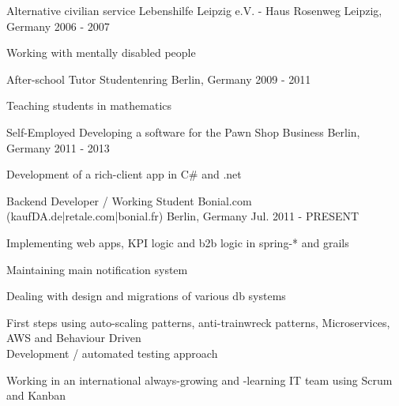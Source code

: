 


\begin{cventries}


\cventry
{Alternative civilian service} %
{Lebenshilfe Leipzig e.V. - Haus Rosenweg} %
{Leipzig, Germany} %
{2006 - 2007} %
{ %
\begin{cvitems}
\item {Working with mentally disabled people}
\end{cvitems}
}

\cventry
{After-school Tutor} %
{Studentenring} %
{Berlin, Germany} %
{2009 - 2011} %
{ %
\begin{cvitems}
\item {Teaching students in mathematics}
\end{cvitems}
}

\cventry
{Self-Employed} %
{Developing a software for the Pawn Shop Business} %
{Berlin, Germany} %
{2011 - 2013} %
{ %
\begin{cvitems}
\item {Development of a rich-client app in C\# and .net}
\end{cvitems}
}

\cventry
{Backend Developer / Working Student} %
{Bonial.com (kaufDA.de|retale.com|bonial.fr)} %
{Berlin, Germany} %
{Jul. 2011 - PRESENT} %
{ %
\begin{cvitems}
\item {Implementing web apps, KPI logic and b2b logic in spring-* and grails}
\item {Maintaining main notification system}
\item {Dealing with design and migrations of various db systems}
\item {First steps using auto-scaling patterns, anti-trainwreck patterns, Microservices, AWS and Behaviour Driven \\ Development / automated testing approach}
\item {Working in an international always-growing and -learning IT team using Scrum and Kanban}
\end{cvitems}
}



\end{cventries}